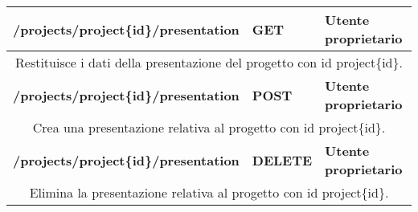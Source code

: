 \begin{table}[H]
			\begin{tabular}{|p{}|p{}|p{}|}
				\toprule
				\textbf{/projects/project\{id\}/presentation} & \textbf{GET} & \textbf{Utente proprietario} \\ \midrule
				\multicolumn{3}{|c|}{Restituisce i dati della presentazione del progetto con id project\{id\}.} \\
				\bottomrule
				\textbf{/projects/project\{id\}/presentation} & \textbf{POST} & \textbf{Utente proprietario} \\ \midrule
				\multicolumn{3}{|c|}{Crea una presentazione relativa al progetto con id project\{id\}.} \\
				\bottomrule
				\textbf{/projects/project\{id\}/presentation} & \textbf{DELETE} & \textbf{Utente proprietario} \\ \midrule
				\multicolumn{3}{|c|}{Elimina la presentazione relativa al progetto con id project\{id\}.} \\
				\bottomrule
			\end{tabular}\\
			\par\bigskip
			

\end{table}
